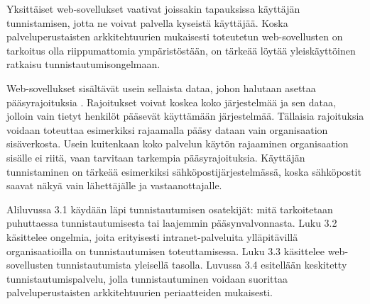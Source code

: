 Yksittäiset web-sovellukset vaativat joissakin tapauksissa käyttäjän tunnistamisen, jotta ne voivat palvella kyseistä käyttäjää. Koska palveluperustaisten arkkitehtuurien mukaisesti toteutetun web-sovellusten on tarkoitus olla riippumattomia ympäristöstään, on tärkeää löytää yleiskäyttöinen ratkaisu tunnistautumisongelmaan.

Web-sovellukset sisältävät usein sellaista dataa, johon halutaan asettaa pääsyrajoituksia \cite{inside_the_identity_management_game}. Rajoitukset voivat koskea koko järjestelmää ja sen dataa, jolloin vain tietyt henkilöt pääsevät käyttämään järjestelmää. Tällaisia rajoituksia voidaan toteuttaa esimerkiksi rajaamalla pääsy dataan vain organisaation sisäverkosta. Usein kuitenkaan koko palvelun käytön rajaaminen organisaation sisälle ei riitä, vaan tarvitaan tarkempia pääsyrajoituksia. Käyttäjän tunnistaminen on tärkeää esimerkiksi sähköpostijärjestelmässä, koska sähköpostit saavat näkyä vain lähettäjälle ja vas\-taan\-ot\-ta\-jal\-le.

Aliluvussa 3.1 käydään läpi tunnistautumisen osatekijät: mitä tarkoitetaan puhuttaessa tunnistautumisesta tai laajemmin pääsynvalvonnasta. Luku 3.2 käsittelee ongelmia, joita erityisesti intranet-palveluita ylläpitävillä organisaatioilla on tunnistautumisen toteuttamisessa. Luku 3.3 käsittelee web-sovellusten tunnistautumista yleisellä tasolla. Luvussa 3.4 esitellään keskitetty tunnistautumispalvelu, jolla tunnistautuminen voidaan suorittaa palveluperustaisten arkkitehtuurien periaatteiden mukaisesti.